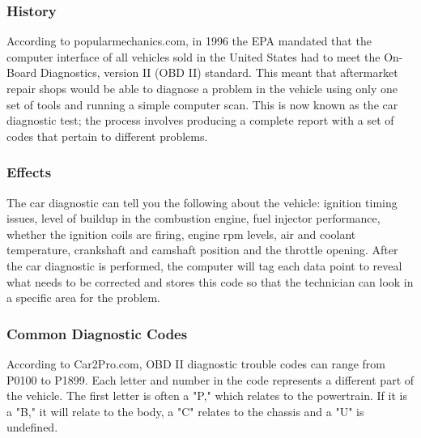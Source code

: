 \subsubsection{History}
According to popularmechanics.com, in 1996 the EPA mandated that the computer interface of all vehicles sold in the United States had to meet the On-Board Diagnostics, version II (OBD II) standard. This meant that aftermarket repair shops would be able to diagnose a problem in the vehicle using only one set of tools and running a simple computer scan. This is now known as the car diagnostic test; the process involves producing a complete report with a set of codes that pertain to different problems.\cite{7}
\subsubsection{Effects}
The car diagnostic can tell you the following about the vehicle: ignition timing issues, level of buildup in the combustion engine, fuel injector performance, whether the ignition coils are firing, engine rpm levels, air and coolant temperature, crankshaft and camshaft position and the throttle opening. After the car diagnostic is performed, the computer will tag each data point to reveal what needs to be corrected and stores this code so that the technician can look in a specific area for the problem.\cite{7}

\subsubsection{Common Diagnostic Codes}
According to Car2Pro.com, OBD II diagnostic trouble codes can range from P0100 to P1899. Each letter and number in the code represents a different part of the vehicle. The first letter is often a "P," which relates to the powertrain. If it is a "B," it will relate to the body, a "C" relates to the chassis and a "U" is undefined.

